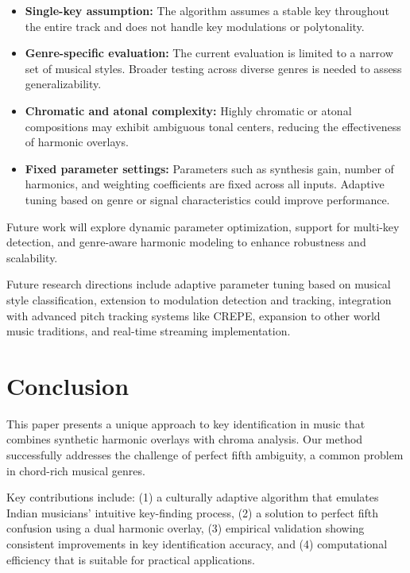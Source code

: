 \documentclass[10pt,twocolumn]{article}
\begin{document}
\begin{itemize}
    \item \textbf{Single-key assumption:} The algorithm assumes a stable key throughout the entire track and does not handle key modulations or polytonality.

    \item \textbf{Genre-specific evaluation:} The current evaluation is limited to a narrow set of musical styles.
    Broader testing across diverse genres is needed to assess generalizability.

    \item \textbf{Chromatic and atonal complexity:} Highly chromatic or atonal compositions may exhibit ambiguous tonal centers, reducing the effectiveness of harmonic overlays.

    \item \textbf{Fixed parameter settings:} Parameters such as synthesis gain, number of harmonics, and weighting coefficients are fixed across all inputs. Adaptive tuning based on genre or signal characteristics could improve performance.
\end{itemize}

Future work will explore dynamic parameter optimization, support for multi-key detection, and genre-aware harmonic modeling to enhance robustness and scalability.

Future research directions include adaptive parameter tuning based on musical style classification, extension to modulation detection and tracking, integration with advanced pitch tracking systems like CREPE, expansion to other world music traditions, and real-time streaming implementation.

\section{Conclusion}\label{sec:conclusion}
This paper presents a unique approach to key identification in music that combines synthetic harmonic overlays with chroma analysis.
Our method successfully addresses the challenge of perfect fifth ambiguity, a common problem in chord-rich musical genres.

Key contributions include: (1) a culturally adaptive algorithm that emulates Indian musicians' intuitive key-finding process, (2) a solution to perfect fifth confusion using a dual harmonic overlay, (3) empirical validation showing consistent improvements in key identification accuracy, and (4) computational efficiency that is suitable for practical applications.
\end{document}
